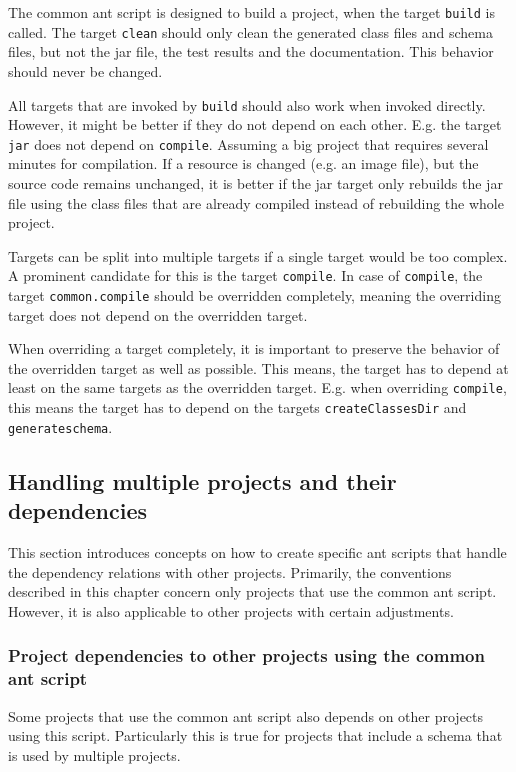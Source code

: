 \documentclass[a4paper,twoside,11pt,bibtotoc]{article}
\begin{document}
The common ant script is designed to build a project, when the target \texttt{build} is called.
The target \texttt{clean} should only clean the generated class files and schema files, but not the jar file, the test results and the documentation.
This behavior should never be changed.

All targets that are invoked by \texttt{build} should also work when invoked directly.
However, it might be better if they do not depend on each other.
E.g. the target \texttt{jar} does not depend on \texttt{compile}.
Assuming a big project that requires several minutes for compilation.
If a resource is changed (e.g. an image file), but the source code remains unchanged, it is better if the jar target only rebuilds the jar file using the class files that are already compiled instead of rebuilding the whole project.

Targets can be split into multiple targets if a single target would be too complex.
A prominent candidate for this is the target \texttt{compile}.
In case of \texttt{compile}, the target \texttt{common.compile} should be overridden completely, meaning the overriding target does not depend on the overridden target.

When overriding a target completely, it is important to preserve the behavior of the overridden target as well as possible.
This means, the target has to depend at least on the same targets as the overridden target.
E.g. when overriding \texttt{compile}, this means the target has to depend on the targets \texttt{createClassesDir} and \texttt{generateschema}.

\subsection{Handling multiple projects and their dependencies}
\label{sec:dependency}
This section introduces concepts on how to create specific ant scripts that handle the dependency relations with other projects.
Primarily, the conventions described in this chapter concern only projects that use the common ant script.
However, it is also applicable to other projects with certain adjustments.

\subsubsection{Project dependencies to other projects using the common ant script}
\label{sec:common_project_dep}
Some projects that use the common ant script also depends on other projects using this script.
Particularly this is true for projects that include a schema that is used by multiple projects.
\end{document}
